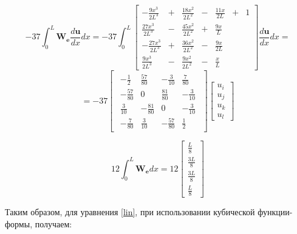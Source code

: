 $$
 -37   \int_0^L \mathbf{W_e} \frac{d \mathbf{u}}{dx} dx
=
 -37  \int_0^L
\begin{bmatrix}
  -\frac{9x^3}{2L^3}&+&\frac{18x^2}{2L^2}&-&\frac{11x}{2L} &+& 1\\
  \frac{27x^3}{2L^3}&-&\frac{45x^2}{2L^2}&+&\frac{9x}{L}&&\\
  -\frac{27x^3}{2L^3}&+&\frac{36x^2}{2L^2}&-&\frac{9x}{2L}&&\\
  \frac{9x^3}{2L^3}&-&\frac{9x^2}{2L^2}&-&\frac{x}{L}&&
\end{bmatrix}
\frac{d \mathbf{u}}{dx} dx
=
$$
$$
=
 -37  
\begin{bmatrix}
\begin{array}{rrrr}
	-\frac{1}{2} & \frac{57}{80} & -\frac{3}{10} & \frac{7}{80}\\
	-\frac{57}{80} & 0 & \frac{81}{80} & -\frac{3}{10} \\
	\frac{3}{10} & -\frac{81}{80} & 0 & -\frac{3}{10}\\
	-\frac{7}{80} & \frac{3}{10} & -\frac{57}{80} & \frac{1}{2}
\end{array}
\end{bmatrix}
\begin{bmatrix}
	u_i \\
	u_j \\
	u_k\\
	u_l
\end{bmatrix}
$$





$$
12 \int_0^L \mathbf{W_e} d x
=
12
\begin{bmatrix}
	\frac{L}{8} \\
	\frac{3L}{8}\\
	\frac{3L}{8}\\
	\frac{L}{8}
\end{bmatrix}
$$


\newpage
Таким образом, для уравнения \ref{lin}, при использовании кубической функции-формы,  получаем:

